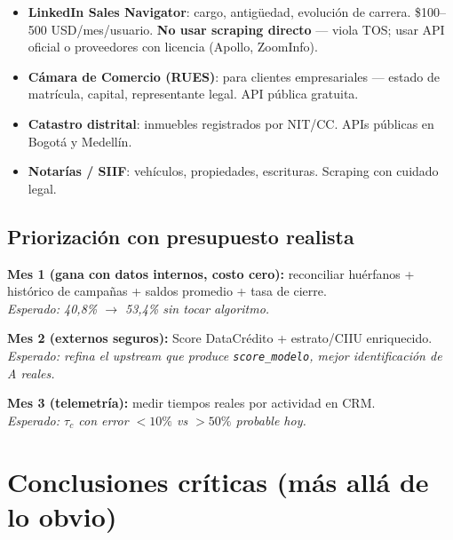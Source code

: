 \documentclass[11pt,a4paper]{article}
\begin{document}
\begin{itemize}
    \item \textbf{LinkedIn Sales Navigator}: cargo, antigüedad, evolución de carrera. \$100--500 USD/mes/usuario. \textbf{No usar scraping directo} --- viola TOS; usar API oficial o proveedores con licencia (Apollo, ZoomInfo).
    \item \textbf{Cámara de Comercio (RUES)}: para clientes empresariales --- estado de matrícula, capital, representante legal. API pública gratuita.
    \item \textbf{Catastro distrital}: inmuebles registrados por NIT/CC. APIs públicas en Bogotá y Medellín.
    \item \textbf{Notarías / SIIF}: vehículos, propiedades, escrituras. Scraping con cuidado legal.
\end{itemize}

\subsection{Priorización con presupuesto realista}

\begin{insightbox}
\textbf{Mes 1 (gana con datos internos, costo cero):} reconciliar huérfanos + histórico de campañas + saldos promedio + tasa de cierre.\\
\emph{Esperado: 40,8\% $\to$ 53,4\% sin tocar algoritmo.}

\medskip
\textbf{Mes 2 (externos seguros):} Score DataCrédito + estrato/CIIU enriquecido.\\
\emph{Esperado: refina el upstream que produce \texttt{score\_modelo}, mejor identificación de A reales.}

\medskip
\textbf{Mes 3 (telemetría):} medir tiempos reales por actividad en CRM.\\
\emph{Esperado: $\tau_c$ con error $<10\%$ vs $>50\%$ probable hoy.}
\end{insightbox}

\section{Conclusiones críticas (más allá de lo obvio)}
\end{document}
